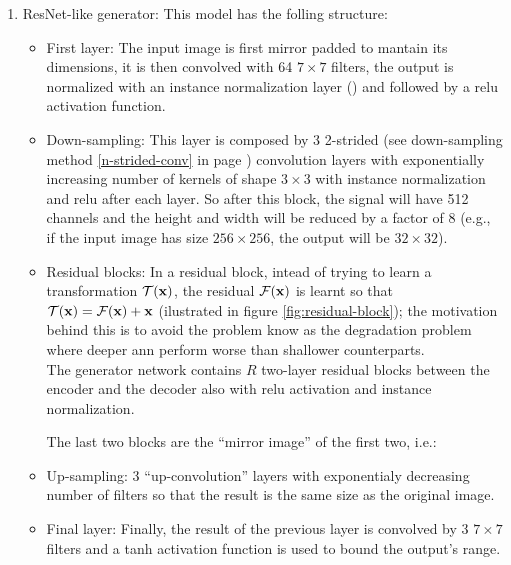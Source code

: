\documentclass[../main.tex]{subfiles}
\begin{document}
\begin{enumerate}
  \item ResNet-like generator: This model has the folling structure:
  \begin{itemize}
    \item First layer: The input image is first mirror padded to mantain its
    dimensions, it is then convolved with 64 $7 \times 7$ filters, the output
    is normalized with an instance normalization layer
    (\cite{ulyanov2016instance}) and followed by a \gls{relu} activation function.

    \item Down-sampling: This layer is composed by 3 2-strided
    (see down-sampling method \ref{n-strided-conv} in page
    \pageref{n-strided-conv}) convolution
    layers with exponentially increasing number of kernels of shape $3 \times 3$
    with instance normalization and \gls{relu} after each layer. So after this
    block, the signal will have 512 channels and the height and width will
    be reduced by a factor of 8 (e.g., if the input image has size
    $256 \times 256$, the output will be $32 \times 32$).

    \item Residual blocks: In a residual block, intead of trying to learn
    a transformation $\mathcal{T}(\mathbf{x})$, the residual
    $\mathcal{F}(\mathbf{x})$ is learnt so that
    $\mathcal{T}(\mathbf{x}) = \mathcal{F}(\mathbf{x}) + \mathbf{x}$
    (ilustrated in figure \ref{fig:residual-block});
    the motivation behind this is to
    avoid the problem know as the degradation problem where deeper \gls{ann}
    perform worse than shallower counterparts.\\
    The generator network contains $R$ two-layer residual blocks between
    the encoder and the decoder also with \gls{relu} activation and
    instance normalization.

The last two blocks are the ``mirror image'' of the first two, i.e.:

    \item Up-sampling: 3 ``up-convolution'' layers with exponentialy decreasing
    number of filters so that the result is the same size as the original image.

    \item Final layer: Finally, the result of the previous layer is convolved
    by 3 $7 \times 7$ filters and a tanh activation function is used to
    bound the output's range.
  \end{itemize}


\end{enumerate}
\end{document}
